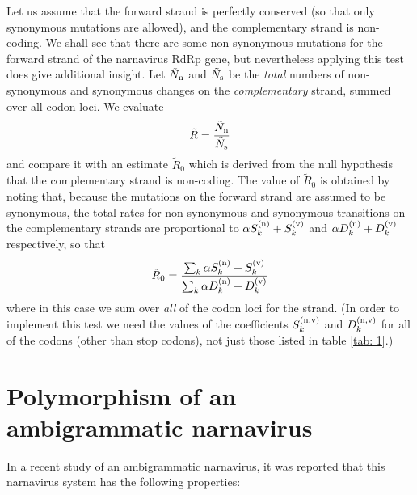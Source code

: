 \documentclass[unnumsec,webpdf,contemporary,large,namedate]{oup-authoring-template}%
\theoremstyle{thmstyleone}%
\theoremstyle{thmstyletwo}%
\theoremstyle{thmstylethree}%
\begin{document}
Let us assume that the forward strand is perfectly conserved (so that only synonymous 
mutations are allowed), and the complementary strand is non-coding. We shall see that there are some 
non-synonymous mutations for the forward strand of the narnavirus RdRp gene, but nevertheless applying this 
test does give additional insight. Let $\tilde N_{\rm n}$ and $\tilde N_{\rm s}$ 
be the \emph{total} numbers of non-synonymous and synonymous changes on the \emph{complementary} strand, 
summed over all codon loci. We evaluate 
%
\begin{equation}
\label{eq: 3.8}
\tilde R=\frac{\tilde N_{\rm n}}{\tilde N_{\rm s}}
\end{equation}
%
and compare it with an estimate $\tilde R_0$ which is derived from the null hypothesis that the complementary 
strand is non-coding. The value of $\tilde R_0$ is obtained by noting that, because the mutations on the forward 
strand are assumed to be synonymous, the total rates for non-synonymous and synonymous transitions 
on the complementary strands are proportional to $\alpha S^{({\rm n})}_k +S^{({\rm v})}_k$ and 
$\alpha D^{({\rm n})}_k +D^{({\rm v})}_k$ respectively, so that
%
\begin{equation}
\label{eq: 3.9}
\tilde R_0=\frac{\sum_k\alpha S_k^{({\rm n})}+S^{({\rm v})}_k}
{\sum_k \alpha D^{({\rm n})}_k+D_k^{({\rm v})}}
\end{equation}
%
where in this case we sum over \emph{all} of the codon loci for the  strand. 
(In order to implement this test we need the values of the coefficients $S^{({\rm n,v})}_k$ and 
$D^{({\rm n,v})}_k$ for all of the codons (other than stop codons), not just those listed in table \ref{tab: 1}.)

\section{Polymorphism of an ambigrammatic narnavirus}
\label{sec: 4}

In a recent study  \citep{Bat+20} of an ambigrammatic narnavirus, it was reported that this 
narnavirus system has the following properties:
\end{document}
